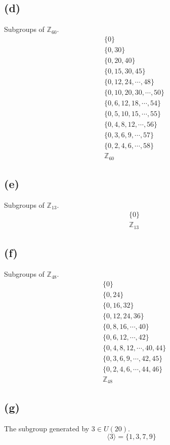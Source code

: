 \documentclass{article}
\begin{document}
\subsection*{(d)}
Subgroups of $\mathbb{Z}_{60}$.
\begin{align*}
    & \{0\} \\
    & \{0,30\} \\
    & \{0,20,40\} \\
    & \{0,15,30,45\} \\
    & \{0,12,24,\cdots,48\} \\
    & \{0,10,20,30,\cdots,50\} \\
    & \{0,6,12,18, \cdots, 54\} \\
    & \{0,5,10,15, \cdots, 55\} \\
    & \{0,4,8,12, \cdots, 56\} \\
    & \{0,3,6,9, \cdots, 57\} \\
    & \{0,2,4,6, \cdots, 58\} \\
    & \mathbb{Z}_{60}
\end{align*}
\subsection*{(e)}
Subgroups of $\mathbb{Z}_{13}$.
\begin{align*}
    & \{0\} \\
    & \mathbb{Z}_{13}
\end{align*}
\subsection*{(f)}
Subgroups of $\mathbb{Z}_{48}$.
\begin{align*}
    & \{0\} \\
    & \{0,24\} \\
    & \{0,16,32\} \\
    & \{0,12,24,36\} \\
    & \{0,8,16, \cdots , 40\} \\
    & \{0,6,12, \cdots, 42\} \\
    & \{0,4,8,12, \cdots, 40,44\} \\
    & \{0,3,6,9, \cdots, 42,45\} \\
    & \{0,2,4,6, \cdots, 44,46\} \\
    & \mathbb{Z}_{48}
\end{align*}
\subsection*{(g)}
The subgroup generated by $3 \in U(20)$.
\[\langle 3 \rangle = \{1,3,7,9\}\]
\end{document}

